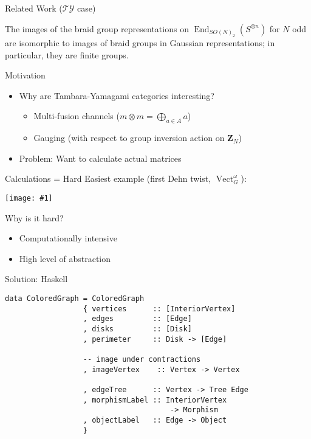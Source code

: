 \documentclass{beamer}
\DeclareMathOperator{\End}{End}
\DeclareMathOperator{\Vect}{Vect}
\newcommand{\img}[1]{
\vfill
\centering
\texttt{[image: \#1]}
\vfill
}
\begin{document}
\begin{frame}{Related Work ($\mathcal{TY}$ case)}
\begin{theorem}
The images of the braid group representations on $\End_{SO(N)_2}(S^{\otimes n})$ for $N$ odd are isomorphic to images of braid groups in Gaussian representations; in particular, they are finite groups.
\end{theorem}

\end{frame}

\begin{frame}{Motivation}
\begin{itemize}
\item Why are Tambara-Yamagami categories interesting?
\begin{itemize}
\item Multi-fusion channels ($m \otimes m = \bigoplus_{a \in A} a$)
\item Gauging (with respect to group inversion action on $\mathbf{Z}_N$)
\end{itemize}
\item Problem: Want to calculate actual matrices 
\end{itemize}
\end{frame}


\begin{frame}{Calculations = Hard}
Easiest example (first Dehn twist, $\Vect^\omega_G$):
\img{hard}
\end{frame}

\begin{frame}{Why is it hard?}
\begin{itemize}
\item Computationally intensive  
\item High level of abstraction
\end{itemize}
\end{frame}

\begin{frame}[fragile]{Solution: Haskell}
\begin{verbatim}
data ColoredGraph = ColoredGraph
                  { vertices      :: [InteriorVertex]
                  , edges         :: [Edge]
                  , disks         :: [Disk]
                  , perimeter     :: Disk -> [Edge]

                  -- image under contractions
                  , imageVertex    :: Vertex -> Vertex     

                  , edgeTree      :: Vertex -> Tree Edge
                  , morphismLabel :: InteriorVertex 
                                      -> Morphism
                  , objectLabel   :: Edge -> Object
                  }
\end{verbatim}
\end{frame}
\end{document}
